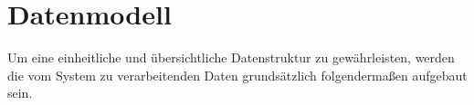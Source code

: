 
\section{Datenmodell}

Um eine einheitliche und übersichtliche Datenstruktur zu gewährleisten, werden die vom System
zu verarbeitenden Daten grundsätzlich folgendermaßen aufgebaut sein.

